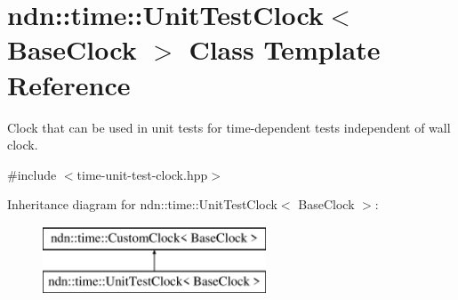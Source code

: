 \hypertarget{classndn_1_1time_1_1UnitTestClock}{}\section{ndn\+:\+:time\+:\+:Unit\+Test\+Clock$<$ Base\+Clock $>$ Class Template Reference}
\label{classndn_1_1time_1_1UnitTestClock}


Clock that can be used in unit tests for time-\/dependent tests independent of wall clock.  




{\ttfamily \#include $<$time-\/unit-\/test-\/clock.\+hpp$>$}

Inheritance diagram for ndn\+:\+:time\+:\+:Unit\+Test\+Clock$<$ Base\+Clock $>$\+:\begin{figure}[H]
\begin{center}
\leavevmode
\includegraphics[height=2.000000cm]{classndn_1_1time_1_1UnitTestClock}
\end{center}
\end{figure}
